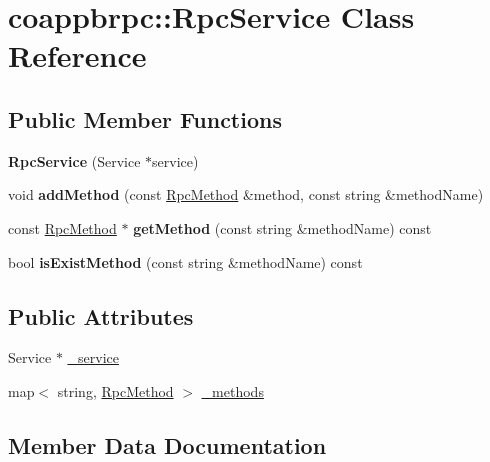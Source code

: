 \hypertarget{classcoappbrpc_1_1RpcService}{}\section{coappbrpc\+:\+:Rpc\+Service Class Reference}
\label{classcoappbrpc_1_1RpcService}
\subsection*{Public Member Functions}
\begin{DoxyCompactItemize}
\item 
\mbox{\label{classcoappbrpc_1_1RpcService_a66c75fc19a62dbf650f4dc5080d15bfa}} 
{\bfseries Rpc\+Service} (Service $\ast$service)
\item 
\mbox{\label{classcoappbrpc_1_1RpcService_a76ef44b476c6c6082ec701feae570d91}} 
void {\bfseries add\+Method} (const \hyperlink{classcoappbrpc_1_1RpcMethod}{Rpc\+Method} \&method, const string \&method\+Name)
\item 
\mbox{\label{classcoappbrpc_1_1RpcService_a56c07781a0e0322f26c1360292d19a51}} 
const \hyperlink{classcoappbrpc_1_1RpcMethod}{Rpc\+Method} $\ast$ {\bfseries get\+Method} (const string \&method\+Name) const
\item 
\mbox{\label{classcoappbrpc_1_1RpcService_a0c7f4041e49a3d4e0abd6eb9aad9691d}} 
bool {\bfseries is\+Exist\+Method} (const string \&method\+Name) const
\end{DoxyCompactItemize}
\subsection*{Public Attributes}
\begin{DoxyCompactItemize}
\item 
Service $\ast$ \hyperlink{classcoappbrpc_1_1RpcService_ab79621dd2a66b154352101e64f2dfefa}{\+\_\+service}
\item 
map$<$ string, \hyperlink{classcoappbrpc_1_1RpcMethod}{Rpc\+Method} $>$ \hyperlink{classcoappbrpc_1_1RpcService_a14b0b1bae1efc308e1c61d7737b7c4ac}{\+\_\+methods}
\end{DoxyCompactItemize}


\subsection{Member Data Documentation}
\mbox{\label{classcoappbrpc_1_1RpcService_a14b0b1bae1efc308e1c61d7737b7c4ac}} 
